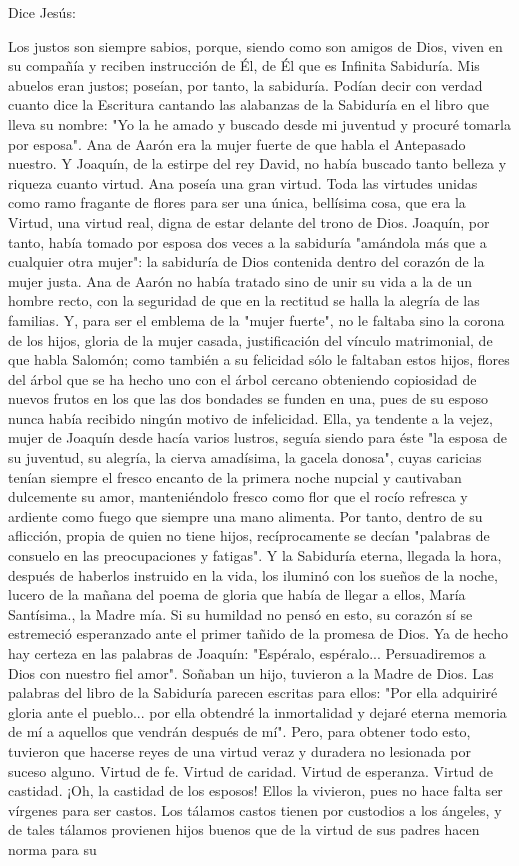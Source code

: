 \documentclass[12pt, twoside, openright]{book} %
\begin{document}
Dice Jesús: 

Los justos son siempre sabios, porque, siendo como son amigos de Dios, viven en su compañía y reciben instrucción de Él, de Él que es Infinita Sabiduría. Mis abuelos eran justos; poseían, por tanto, la sabiduría. Podían decir con verdad cuanto dice la Escritura cantando las alabanzas de la Sabiduría en el libro que lleva su nombre: "Yo la he amado y buscado desde mi juventud y procuré tomarla por esposa". Ana de Aarón era la mujer fuerte de que habla el Antepasado nuestro. Y Joaquín, de la estirpe del rey David, no había buscado tanto belleza y riqueza cuanto virtud. Ana poseía una gran virtud. Toda las virtudes unidas como ramo fragante de flores para ser una única, bellísima cosa, que era la Virtud, una virtud real, digna de estar delante del trono de Dios. Joaquín, por tanto, había tomado por esposa dos veces a la sabiduría "amándola más que a cualquier otra mujer": la sabiduría de Dios contenida dentro del corazón de la mujer justa. Ana de Aarón no había tratado sino de unir su vida a la de un hombre recto, con la seguridad de que en la rectitud se halla la alegría de las familias. Y, para ser el emblema de la "mujer fuerte", no le faltaba sino la corona de los hijos, gloria de la mujer casada, justificación del vínculo matrimonial, de que habla Salomón; como también a su felicidad sólo le faltaban estos hijos, flores del árbol que se ha hecho uno con el árbol cercano obteniendo copiosidad de nuevos frutos en los que las dos bondades se funden en una, pues de su esposo nunca había recibido ningún motivo de infelicidad. Ella, ya tendente a la vejez, mujer de Joaquín desde hacía varios lustros, seguía siendo para éste "la esposa de su juventud, su alegría, la cierva amadísima, la gacela donosa", cuyas caricias tenían siempre el fresco encanto de la primera noche nupcial y cautivaban dulcemente su amor, manteniéndolo fresco como flor que el rocío refresca y ardiente como fuego que siempre una mano alimenta. Por tanto, dentro de su aflicción, propia de quien no tiene hijos, recíprocamente se decían "palabras de consuelo en las preocupaciones y fatigas". Y la Sabiduría eterna, llegada la hora, después de haberlos instruido en la vida, los iluminó con los sueños de la noche, lucero de la mañana del poema de gloria que había de llegar a ellos, María Santísima., la Madre mía. Si su humildad no pensó en esto, su corazón sí se estremeció esperanzado ante el primer tañido de la promesa de Dios. Ya de hecho hay certeza en las palabras de Joaquín: "Espéralo, espéralo... Persuadiremos a Dios con nuestro fiel amor". Soñaban un hijo, tuvieron a la Madre de Dios. Las palabras del libro de la Sabiduría parecen escritas para ellos: "Por ella adquiriré gloria ante el pueblo... por ella obtendré la inmortalidad y dejaré eterna memoria de mí a aquellos que vendrán después de mí". Pero, para obtener todo esto, tuvieron que hacerse reyes de una virtud veraz y duradera no lesionada por suceso alguno. Virtud de fe. Virtud de caridad. Virtud de esperanza. Virtud de castidad. ¡Oh, la castidad de los esposos! Ellos la vivieron, pues no hace falta ser vírgenes para ser castos. Los tálamos castos tienen por custodios a los ángeles, y de tales tálamos provienen hijos buenos que de la virtud de sus padres hacen norma para su 
\end{document}
